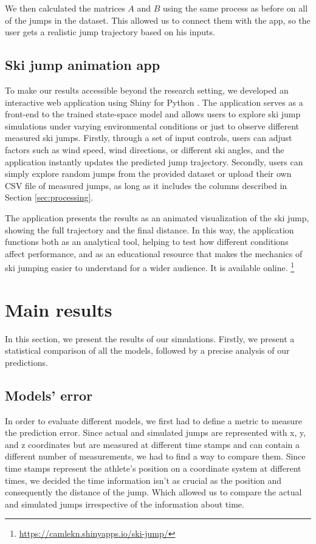 \documentclass[sigconf,natbib=false, language=english]{acmart}
\begin{document}
We then calculated the matrices $A$ and $B$ using the same process
as before on all of the jumps in the dataset. This allowed us to connect them with the app, so the user gets a realistic jump trajectory
based on his inputs.

\subsection{Ski jump animation app}

To make our results accessible beyond the research setting, we developed an interactive web application using Shiny for Python \cite{shiny_python}. The application serves as a front-end to the trained state-space model and allows users to explore ski jump simulations under varying environmental conditions or just to observe different measured ski jumps. Firstly, through a set of input controls, users can adjust factors such as wind speed, wind directions, or different ski angles, and the application instantly updates the predicted jump trajectory.
Secondly, users can simply explore random jumps from the provided dataset or upload their own CSV file of measured jumps, as long as it includes the columns described in Section \ref{sec:processing}.

The application presents the results as an animated visualization of the ski jump, 
showing the full trajectory and the final distance. In this way, the application functions both as an analytical tool, helping to test how different conditions affect performance, and as an educational resource that makes the mechanics of ski jumping easier to understand for a wider audience. It is available online. \footnote{\url{https://camlekn.shinyapps.io/ski-jump/}}

\section{Main results}\label{sec:results}
In this section, we present the results of our simulations. Firstly, we present a statistical comparison of all the models, followed by a precise analysis of our predictions.

\subsection{Models' error}\label{sec:error}
In order to evaluate different models, we first had to define a metric to
measure the prediction error. Since actual and simulated jumps are represented
with x, y, and z coordinates but are measured at different time stamps and can
contain a different number of measurements, we had to find a way to compare
them. Since time stamps represent the athlete's position on a coordinate system 
at different times, we decided the time information isn't as crucial as the 
position and consequently the distance of the jump. Which allowed us to compare
the actual and simulated jumps irrespective of the information about time.
\end{document}
